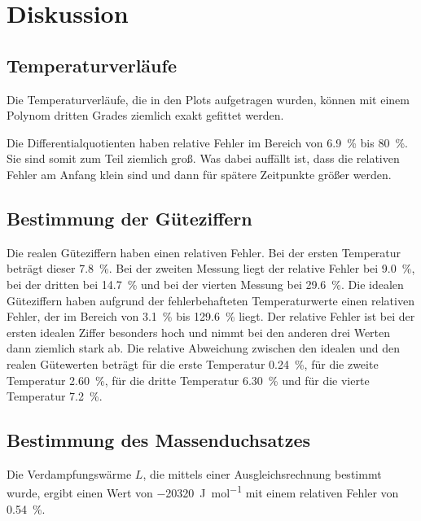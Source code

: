 \section{Diskussion}
\label{sec:Diskussion}

\subsection{Temperaturverläufe}
Die Temperaturverläufe, die in den Plots aufgetragen wurden, können mit einem 
Polynom dritten Grades ziemlich exakt gefittet werden. 

\noindent Die Differentialquotienten haben relative Fehler im Bereich von \SI{6.9}{\percent} 
bis \SI{80}{\percent}. Sie sind somit zum Teil ziemlich groß. Was dabei auffällt ist, dass die relativen Fehler 
am Anfang klein sind und dann für spätere Zeitpunkte größer werden.

\subsection{Bestimmung der Güteziffern}
Die realen Güteziffern haben einen relativen Fehler. Bei der ersten Temperatur beträgt 
dieser \SI{7.8}{\percent}. Bei der zweiten Messung liegt der relative Fehler bei 
\SI{9.0}{\percent}, bei der dritten bei \SI{14.7}{\percent} und bei der 
vierten Messung bei \SI{29.6}{\percent}. 
Die idealen Güteziffern haben aufgrund der fehlerbehafteten Temperaturwerte einen 
relativen Fehler, der im Bereich von \SI{3.1}{\percent} bis \SI{129.6}{\percent} 
liegt. Der relative Fehler ist bei der ersten idealen Ziffer besonders hoch und nimmt bei den anderen drei Werten dann ziemlich stark ab.%
Die relative Abweichung zwischen den idealen und den realen Gütewerten beträgt für die 
erste Temperatur \SI{0.24}{\percent}, für die zweite Temperatur 
\SI{2.60}{\percent}, für die dritte Temperatur \SI{6.30}{\percent} und für die 
vierte Temperatur \SI{7.2}{\percent}.


\subsection{Bestimmung des Massenduchsatzes}
Die Verdampfungswärme $L$, die mittels einer Ausgleichsrechnung bestimmt wurde, 
ergibt einen Wert von \SI{-20320}{\joule\per\mol} mit einem relativen Fehler von 
\SI{0.54}{\percent}. %

